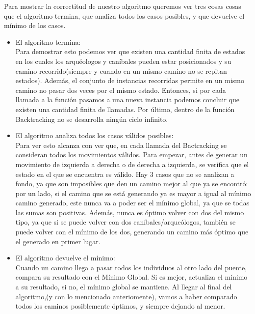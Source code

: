 \documentclass[spanish,12pt]{article}
\begin{document}
Para mostrar la correctitud de nuestro algoritmo queremos ver tres cosas cosas que el algoritmo termina, que analiza todos los casos posibles, y que devuelve el mínimo de los casos.
\begin{itemize}

	\item El algoritmo termina: \\
Para demostrar esto podemos ver que existen una cantidad finita de estados en los cuales los arquéologos y caníbales pueden estar posicionados y su camino recorrido(siempre y cuando en un mismo camino no se repitan estados). Además, el conjunto de instancias recorridas permite en un mismo camino no pasar dos veces por el mismo estado. Entonces, si por cada llamada a la función pasamos a una nueva instancia podemos concluir que existen una cantidad finita de llamadas. Por último, dentro de la función Backtracking no se desarrolla ningún ciclo infinito.


	\item El algoritmo analiza todos los casos válidos posibles: \\
Para ver esto alcanza con ver que, en cada llamada del Bactracking se consideran todos los movimientos válidos. Para empezar, antes de generar un movimiento de izquierda a derecha o de derecha a izquierda, se verifica que el estado en el que se encuentra es válido. Hay 3 casos que no se analizan a fondo, ya que son imposibles que den un camino mejor al que ya se encontró: por un lado, si el camino que se está generando ya es mayor a igual al mínimo camino generado, este nunca va a poder ser el mínimo global, ya que se todas las sumas son positivas.
Además, nunca es óptimo volver con dos del mismo tipo, ya que si se puede volver con dos caníbales/arqueólogos, también se puede volver con el mínimo de los dos, generando un camino más óptimo que el generado en primer lugar.

	\item El algoritmo devuelve el mínimo: \\
Cuando un camino llega a pasar todos los individuos al otro lado del puente, compara su resultado con el Mínimo Global. Si es mejor, actualiza el mínimo a su resultado, si no, el mínimo global se mantiene. Al llegar al final del algoritmo,(y con lo mencionado anteriomente), vamos a haber comparado todos los caminos posiblemente óptimos, y siempre dejando al menor.



\end{itemize}
\end{document}
